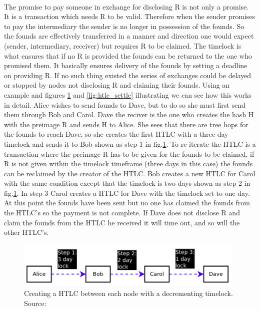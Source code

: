 \paragraph{}
The promise to pay someone in exchange for disclosing R is not only a promise. It is a transaction which needs R to be valid. Therefore when the sender promises to pay the intermediary the sender is no longer in possession of the founds. So the founds are effectively transferred in a manner and direction one would expect (sender, intermediary, receiver) but requires R to be claimed. The timelock is what ensures that if no R is provided the founds can be returned to the one who promised them. It basically ensures delivery of the founds by setting a deadline on providing R. If no such thing existed the series of exchanges could be delayed or stopped by nodes not disclosing R and claiming their founds.
Using an example and figures \ref{fig:htlc_promise} and \ref{fig:htlc_settle} illustrating we can see how this works in detail.
Alice wishes to send founds to Dave, but to do so she must first send them through Bob and Carol. Dave the reciver is the one who creates the hash H with the preimage R and sends H to Alice. She sees that there are tree hops for the founds to reach Dave, so she creates the first HTLC with a three day timelock and sends it to Bob shown as step 1 in fig.\ref{fig:htlc_promise}. To re-iterate the HTLC is a transaction where the preimage R has to be given for the founds to be claimed, if R is not given within the timelock timeframe (three days in this case) the founds can be reclaimed by the creator of the HTLC. Bob creates a new HTLC for Carol with the same condition except that the timelock is two days shown as step 2 in fig.\ref{fig:htlc_promise}. In step 3 Carol creates a HTLC for Dave with the timelock set to one day. At this point the founds have been sent but no one has claimed the founds from the HTLC's so the payment is not complete. If Dave does not disclose R and claim the founds from the HTLC he received it will time out, and so will the other HTLC's.

\begin{figure}[h]
    \centering
    \includegraphics[width=11cm]{figures/htlc_promise.png}
    \caption{ Creating a HTLC between each node with a decrementing timelock. Source: \cite{poon2015bitcoin}}
    \label{fig:htlc_promise}
\end{figure}

